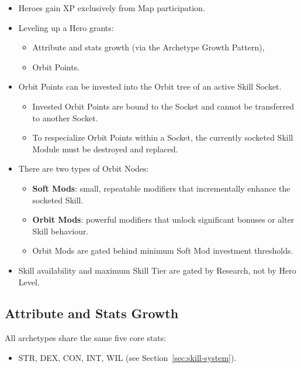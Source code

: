 \begin{itemize}
	\item Heroes gain XP exclusively from Map participation.
	
	\item Leveling up a Hero grants:
	\begin{itemize}
		\item Attribute and stats growth (via the Archetype Growth Pattern),
		\item Orbit Points.
	\end{itemize}
	
	\item Orbit Points can be invested into the Orbit tree of an active Skill Socket.
	\begin{itemize}
		\item Invested Orbit Points are bound to the Socket and cannot be transferred to another Socket.
		\item To respecialize Orbit Points within a Socket, the currently socketed Skill Module must be destroyed and replaced.
	\end{itemize}
	
	\item There are two types of Orbit Nodes:
	\begin{itemize}
		\item \textbf{Soft Mods}: small, repeatable modifiers that incrementally enhance the socketed Skill.
		\item \textbf{Orbit Mods}: powerful modifiers that unlock significant bonuses or alter Skill behaviour.
		\item Orbit Mods are gated behind minimum Soft Mod investment thresholds.
	\end{itemize}
	
	\item Skill availability and maximum Skill Tier are gated by Research, not by Hero Level.
\end{itemize}

\subsection{Attribute and Stats Growth}

All archetypes share the same five core stats:

\begin{itemize}
	\item STR, DEX, CON, INT, WIL (see Section~\ref{sec:skill-system}).
\end{itemize}

